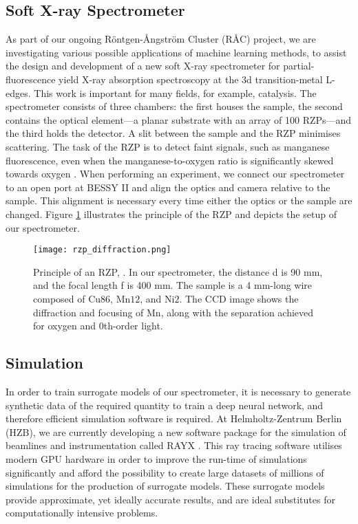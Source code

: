 \documentclass{iopconfser}
\begin{document}
\subsection{Soft X-ray Spectrometer}
As part of our ongoing Röntgen-Ångström Cluster (RÅC) project, we are investigating various possible applications of machine learning methods, to assist the design and development of a new soft X-ray spectrometer for partial-fluorescence yield X-ray absorption spectroscopy at the 3d transition-metal L-edges. This work is important for many fields, for example, catalysis. The spectrometer consists of three chambers: the first houses the sample, the second contains the optical element—a planar substrate with an array of 100 RZPs—and the third holds the detector. A slit between the sample and the RZP minimises scattering. The task of the RZP is to detect faint signals, such as manganese fluorescence, even when the manganese-to-oxygen ratio is significantly skewed towards oxygen \cite{10.1063/1.4986627}. When performing an experiment, we connect our spectrometer to an open port at BESSY II and align the optics and camera relative to the sample. This alignment is necessary every time either the optics or the sample are changed. Figure \ref{RZP} illustrates the principle of the RZP and depicts the setup of our spectrometer.

\begin{figure}[H]
    \centering
    \texttt{[image: rzp\_diffraction.png]}
    \caption{Principle of an RZP, \cite{kubin_manganese_2019}. In our spectrometer, the distance d is 90 mm, and the focal length f is 400 mm. The sample is a 4 mm-long wire composed of Cu\(86\), Mn\(12\), and Ni\(2\). The CCD image shows the diffraction and focusing of Mn, along with the separation achieved for oxygen and 0th-order light.}
\label{RZP}
\end{figure}

\subsection{Simulation}
In order to train surrogate models of our spectrometer, it is necessary to generate synthetic data of the required quantity to train a deep neural network, and therefore efficient simulation software is required. At Helmholtz-Zentrum Berlin (HZB), we are currently developing a new software package for the simulation of beamlines and instrumentation called RAYX \cite{rayx}. This ray tracing software utilises modern GPU hardware in order to improve the run-time of simulations significantly and afford the possibility to create large datasets of millions of simulations for the production of surrogate models. These surrogate models provide approximate, yet ideally accurate results, and are ideal substitutes for computationally intensive problems.
\end{document}
